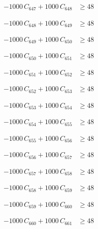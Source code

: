 \documentclass[a4paper,11pt]{article}
\begin{document}
\begin{align}
-1000\,C_{647} + 1000\,C_{648} &\geq 48 \nonumber
\end{align}

\begin{align}
-1000\,C_{648} + 1000\,C_{649} &\geq 48 \nonumber
\end{align}

\begin{align}
-1000\,C_{649} + 1000\,C_{650} &\geq 48 \nonumber
\end{align}

\begin{align}
-1000\,C_{650} + 1000\,C_{651} &\geq 48 \nonumber
\end{align}

\begin{align}
-1000\,C_{651} + 1000\,C_{652} &\geq 48 \nonumber
\end{align}

\begin{align}
-1000\,C_{652} + 1000\,C_{653} &\geq 48 \nonumber
\end{align}

\begin{align}
-1000\,C_{653} + 1000\,C_{654} &\geq 48 \nonumber
\end{align}

\begin{align}
-1000\,C_{654} + 1000\,C_{655} &\geq 48 \nonumber
\end{align}

\begin{align}
-1000\,C_{655} + 1000\,C_{656} &\geq 48 \nonumber
\end{align}

\begin{align}
-1000\,C_{656} + 1000\,C_{657} &\geq 48 \nonumber
\end{align}

\begin{align}
-1000\,C_{657} + 1000\,C_{658} &\geq 48 \nonumber
\end{align}

\begin{align}
-1000\,C_{658} + 1000\,C_{659} &\geq 48 \nonumber
\end{align}

\begin{align}
-1000\,C_{659} + 1000\,C_{660} &\geq 48 \nonumber
\end{align}

\begin{align}
-1000\,C_{660} + 1000\,C_{661} &\geq 48 \nonumber
\end{align}
\end{document}
